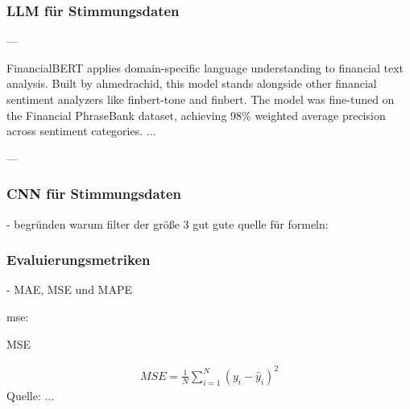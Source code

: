 \subsubsection{LLM für Stimmungsdaten}\label{sec:theorie_llm}
---

FinancialBERT applies domain-specific language understanding to financial text analysis. Built by ahmedrachid, this model stands alongside other financial sentiment analyzers like finbert-tone and finbert. The model was fine-tuned on the Financial PhraseBank dataset, achieving 98\% weighted average precision across sentiment categories.
...

---
\autocite{hazourli2022financialbert}


\subsubsection{CNN für Stimmungsdaten}\label{sec:theorie_cnn}

- begründen warum filter der größe 3 gut
gute quelle für formeln: \autocite{guan2020stockprice}

\subsubsection{Evaluierungsmetriken}\label{sec:theorie_evalmetrics}

- \ac{MAE}, \ac{MSE} und \ac{MAPE}  
\autocite[Kap. 4.3]{xie2024deep}

mse:

\begin{formel}[h]
	\caption{\ac{MSE}}
	\label{frm:mse}
	\begin{align}
		MSE = \frac{1}{N} \sum_{i=1}^{N} (y_i - \hat{y}_i)^2
	\end{align}
	\vspace{0.5em}
	\normalsize{Quelle: ...}
	\vspace{-1.0em}
\end{formel}







